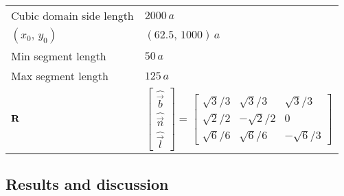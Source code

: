 \begin{table}
\begin{tabular}{ll}
    Cubic domain side length & $2000\, a $                                               \\
    $(x_{0},\, y_{0})$       & $(62.5,\, 1000)\, a$                                      \\
    Min segment length       & $50\, a$                                                  \\
    Max segment length       & $125\, a$                                                 \\
    $\mathbf{R}$                & $\begin{bmatrix} \hat{\vec{b}} \\ \hat{\vec{n}} \\ \hat{\vec{l}} \end{bmatrix} = \begin{bmatrix} \sqrt{3}/3 & \sqrt{3}/3 & \sqrt{3}/3 \\ \sqrt{2}/2 & -\sqrt{2}/2 & 0 \\ \sqrt{6}/6 & \sqrt{6}/6 & -\sqrt{6}/3\end{bmatrix}$ \\
    \bottomrule
  \end{tabular}
\end{table}

\subsection{Results and discussion}\label{ss:paperResults}

